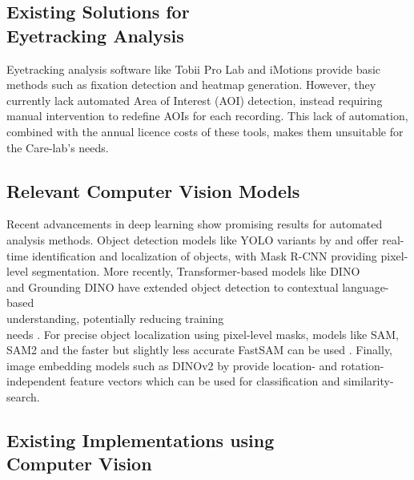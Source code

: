 \documentclass[english]{hogent-article}
\begin{document}
\subsection{Existing Solutions for\\ Eyetracking Analysis}

Eyetracking analysis software like Tobii Pro Lab \textcite{Tobii2025a} and iMotions \textcite{iMotions2025} provide basic methods such as fixation detection and heatmap generation.
However, they currently lack automated Area of Interest (AOI) detection, instead requiring manual intervention to redefine AOIs for each recording.
This lack of automation, combined with the annual licence costs of these tools, makes them unsuitable for the Care-lab's needs.

\subsection{Relevant Computer Vision Models}

Recent advancements in deep learning show promising results for automated analysis methods.
Object detection models like YOLO variants by \textcite{Redmon2016} and \textcite{Khanam2024} 
offer real-time identification and localization of objects, with Mask R-CNN \autocite{He2018} providing pixel-level segmentation.
More recently, Transformer-based models like DINO\\ and Grounding DINO have extended object detection to 
contextual language-based\\ understanding, potentially reducing training\\ needs \autocite{Zhang2022, Liu2023}.
For precise object localization using pixel-level masks, models like SAM, SAM2 and the faster but slightly less 
accurate FastSAM can be used \autocite{Kirillov2023, Ravi2024, Zhao2023}.
Finally, image embedding models such as DINOv2 by \textcite{Oquab2024} provide location- 
and rotation-independent feature vectors which can be used for classification and similarity-search.

\subsection{Existing Implementations using\\ Computer Vision}
\end{document}
